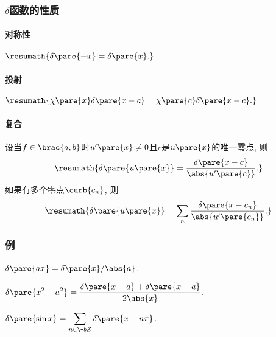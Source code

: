 \documentclass[hidelinks]{ctexart}
\begin{document}

\subsubsection{\texorpdfstring{$\delta$}{delta}函数的性质} %
\label{ssub:_delta_函数的性质}

\paragraph{对称性} %
\label{par:对称性}

$\resumath{\delta\pare{-x} = \delta\pare{x}.}$


\paragraph{投射} %
\label{par:投射}

$\resumath{\chi\pare{x}\delta\pare{x-c} = \chi\pare{c}\delta\pare{x-c}.}$


\paragraph{复合} %
\label{par:复合}

设当$f\in \brac{a,b}$时$u'\pare{x}\neq 0$且$c$是$u\pare{x}$的唯一零点, 则
\[ \resumath{\delta\pare{u\pare{x}} = \frac{\delta\pare{x-c}}{\abs{u'\pare{c}}}.} \]
如果有多个零点$\curb{c_n}$, 则
\[ \resumath{\delta\pare{u\pare{x}} = \sum_n \frac{\delta\pare{x-c_n}}{\abs{u'\pare{c_n}}}.} \]



\subsubsection{例} %
\label{ssub:例}

\begin{ex}
    $\delta\pare{ax} = \delta\pare{x}/\abs{a}$.
\end{ex}
\begin{ex}
    $\displaystyle \delta\pare{x^2-a^2} = \frac{\delta\pare{x-a}+\delta\pare{x+a}}{2\abs{x}}.$
\end{ex}
\begin{ex}
    $\delta\pare{\sin x} = \displaystyle \sum_{n\in \+bZ} \delta\pare{x-n\pi}$.
\end{ex}



\end{document}
